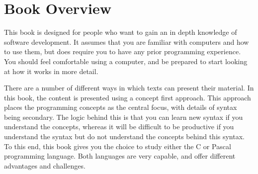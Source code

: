 \section*{Book Overview} %
\label{sub:book_overview}

This book is designed for people who want to gain an in depth knowledge of software development. It assumes that you are familiar with computers and how to use them, but does require you to have any prior programming experience. You should feel comfortable using a computer, and be prepared to start looking at how it works in more detail.

There are a number of different ways in which texts can present their material. In this book, the content is presented using a concept first approach. This approach places the programming concepts as the central focus, with details of syntax being secondary. The logic behind this is that you can learn new syntax if you understand the concepts, whereas it will be difficult to be productive if you understand the syntax but do not understand the concepts behind this syntax. To this end, this book gives you the choice to study either the C or Pascal programming language. Both languages are very capable, and offer different advantages and challenges.

